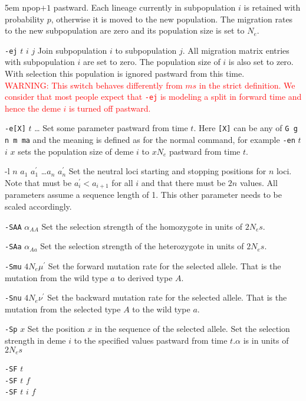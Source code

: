 \documentclass{article}
\begin{document}
\begin{eqlist*}{\topsep5em}
npop$+1$ pastward. Each lineage currently in subpopulation $i$ is retained with
probability $p$, otherwise it is moved to the new population. The migration
rates to the new subpopulation are zero and its population size is set to $N_e$. 
\item[{\tt -ej} $t$ $i$ $j$] Join subpopulation $i$ to subpopulation $j$. All
migration matrix entries with subpopulation $i$ are set to zero. The population
size of $i$ is also set to zero. With selection this population is ignored
pastward from this time.\\
\textcolor{red}{WARNING: This switch behaves differently from $ms$ in the strict
definition. We consider that most people expect that {\tt -ej} is modeling a 
split in forward time and hence the deme $i$ is turned off pastward. }
\item[{\tt -e[X]} $t$ \ldots] Set some parameter pastward from time $t$. Here
{\tt [X]} can be any of {\tt G g n m ma} and the meaning is defined as for the
normal command, for example {\tt -en} $t$ $i$ $x$ sets the population size of
deme $i$ to $xN_e$ pastward from time $t$.
\item[{-l} $n$ $a_1$ $a_1^{'}$ \ldots $a_n$ $a_n^{'}$] Set the neutral loci
starting and stopping positions for $n$ loci. Note that must be $a_i^{'}<a_{i+1}$
for all $i$ and that there must be $2n$ values. All parameters assume a
sequence length of 1. This other parameter needs to be scaled accordingly.   
\item[{\tt -SAA} $\alpha_{AA}$] Set the selection strength of the homozygote in
units of $2N_es$.
\item[{\tt -SAa} $\alpha_{Aa}$] Set the selection strength of the heterozygote
in units of $2N_es$.
\item[{\tt -Smu} $4N_e\mu^{'}$] Set the forward mutation rate for the selected
allele. That is the mutation from the wild type $a$ to
derived type $A$.
\item[{\tt -Snu} $4N_e\nu^{'}$] Set the backward mutation rate for the selected
allele. That is the mutation from the selected type
$A$ to the wild type $a$.
\item[{\tt -Sp} $x$] Set the position $x$ in the sequence of the selected allele.
 Set the
selection strength in deme $i$ to the specified values pastward from time
$t$.$\alpha$ is in units of $2N_es$
\item[{\tt -SF} $t$ \\{\tt -SF} $t$ $f$ \\{\tt -SF} $t$ $i$ $f$] 

\end{eqlist*}
\end{document}
